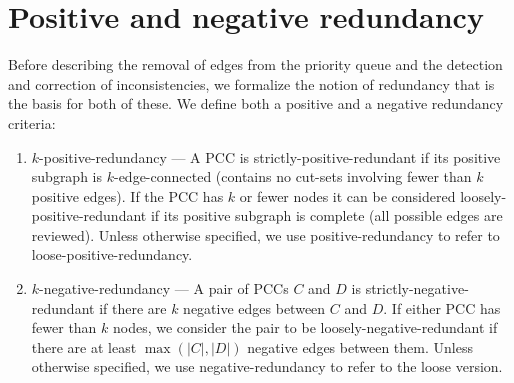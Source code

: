 \section{Positive and negative redundancy}\label{sec:redun}

Before describing the removal of edges from the priority queue and the
detection and correction of inconsistencies, we formalize the notion of
redundancy that is the basis for both of these.
We define both a positive and a negative redundancy criteria:
\begin{enumerate}[label={(\arabic*)},noitemsep,nolistsep]

    \item $k$-positive-redundancy --- %
        A PCC is strictly-positive-redundant if its positive subgraph is
          $k$-edge-connected (contains no cut-sets involving fewer than $k$
          positive edges\cite{Tarjan}).
        If the PCC has $k$ or fewer nodes it can be considered
          loosely-positive-redundant if its positive subgraph is complete (all
          possible edges are reviewed).
        Unless otherwise specified, we use positive-redundancy to refer to
          loose-positive-redundancy.

    \item $k$-negative-redundancy --- %
        A pair of PCCs $C$ and $D$ is strictly-negative-redundant if there are
          $k$ negative edges between $C$ and $D$.
        If either PCC has fewer than $k$ nodes, we consider the pair to be
          loosely-negative-redundant if there are at least $\mathop{max}(|C|,
          |D|)$ negative edges between them.
        Unless otherwise specified, we use negative-redundancy to refer to the
          loose version.

\end{enumerate}
